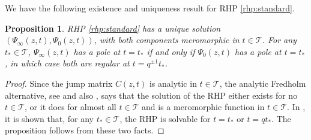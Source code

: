 \documentclass[a4paper,reqno,11pt]{amsart}
\numberwithin{equation}{section}
\numberwithin{figure}{section}
\theoremstyle{plain}
\newtheorem{proposition}[theorem]{Proposition}
\theoremstyle{remark}
\newcounter{rhp}
\numberwithin{rhp}{section}
\begin{document}
We have the following existence and uniqueness result for RHP \ref{rhp:standard}.

\begin{proposition}\label{prop:rhpsolvability}
RHP \ref{rhp:standard} has a unique solution $(\Psi_\infty(z,t),\Psi_0(z,t))$, with both components meromorphic in $t\in \mathcal{T}$. For any $t_*\in \mathcal{T}$, $\Psi_\infty(z,t)$ has a pole at $t=t_*$ if and only if $\Psi_0(z,t)$ has a pole at $t=t_*$, in which case both are regular at $t=q^{\pm 1}t_*$.
\end{proposition}
\begin{proof}
Since the jump matrix $C(z,t)$ is analytic in $t\in \mathcal{T}$,
 the analytic Fredholm alternative, see \cite[Proposition 4.3]{zhourhp} and also \cite[Corollary 3.1]{fokasitskapaev}, says that the solution of the RHP either exists for no $t\in \mathcal{T}$, or it does for almost all $t\in \mathcal{T}$ and is a meromorphic function in $t\in \mathcal{T}$. In \cite[Theorem 2.12]{joshi_rof_qpvi}, it is shown that, for any $t_*\in \mathcal{T}$, the RHP is solvable for $t=t_*$ or $t=q t_*$. The proposition follows from these two facts.
\end{proof}
\end{document}
